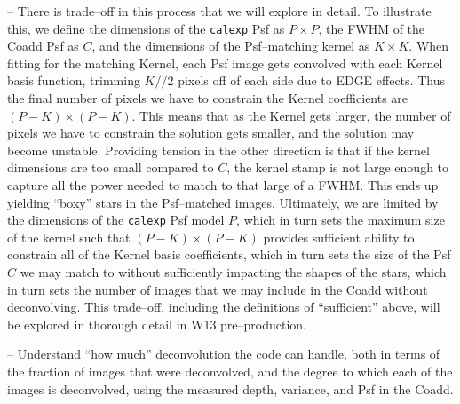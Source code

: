 \documentclass[12pt]{article}
\begin{document}
-- There is trade--off in this process that we will explore in detail.  
To illustrate this, we define the dimensions of
the {\tt calexp} Psf as $P \times P$, the FWHM of the Coadd Psf as
$C$, and the dimensions of the Psf--matching kernel as $K \times K$.
When fitting for the matching Kernel, each Psf image gets convolved
with each Kernel basis function, trimming $K//2$ pixels off of each
side due to EDGE effects.  Thus the final number of pixels we have to
constrain the Kernel coefficients are $(P-K) \times (P-K)$.  This
means that as the Kernel gets larger, the number of pixels we have to
constrain the solution gets smaller, and the solution may become
unstable.  Providing tension in the other direction is that if the
kernel dimensions are too small compared to $C$, the kernel stamp is
not large enough to capture all the power needed to match to that
large of a FWHM.  This ends up yielding ``boxy'' stars in the
Psf--matched images.  Ultimately, we are limited by the dimensions of
the {\tt calexp} Psf model $P$, which in turn sets the maximum size of
the kernel such that $(P-K) \times (P-K)$ provides sufficient ability
to constrain all of the Kernel basis coefficients, which in turn sets
the size of the Psf $C$ we may match to without sufficiently impacting
the shapes of the stars, which in turn sets the number of images that we 
may include in the Coadd without deconvolving.  This trade--off, including the definitions
of ``sufficient'' above, will be explored in thorough detail in W13
pre--production.





-- Understand ``how much'' deconvolution the code can handle,
both in terms of the fraction of images that were deconvolved, and the
degree to which each of the images is deconvolved, using the measured 
depth, variance, and Psf in the Coadd.
\end{document}
